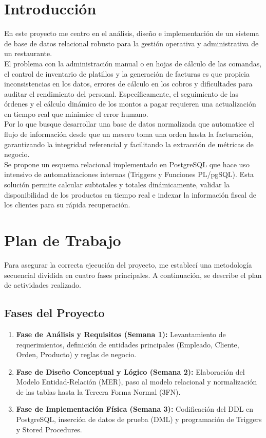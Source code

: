 \documentclass{article}
\begin{document}
\newpage

\section{Introducción}

En este proyecto me centro en el análisis, diseño e implementación de un sistema de base de datos relacional robusto para la gestión operativa y administrativa de un restaurante. \\

El problema con la administración manual o en hojas de cálculo de las comandas, el control de inventario de platillos y la generación de facturas es que propicia inconsistencias en los datos, errores de cálculo en los cobros y dificultades para auditar 
el rendimiento del personal. Específicamente, el seguimiento de las órdenes y el cálculo dinámico de los montos a pagar requieren una actualización en tiempo real que minimice el error humano. \\

Por lo que busque desarrollar una base de datos normalizada que automatice el flujo de información desde que un mesero toma una orden hasta la facturación, garantizando la integridad referencial y facilitando la extracción de métricas de negocio. \\

Se propone un esquema relacional implementado en PostgreSQL que hace uso intensivo de automatizaciones internas (Triggers y Funciones PL/pgSQL). Esta solución permite calcular subtotales y totales dinámicamente, validar la disponibilidad de los productos 
en tiempo real e indexar la información fiscal de los clientes para su rápida recuperación. 

\section{Plan de Trabajo}

Para asegurar la correcta ejecución del proyecto, me establecí una metodología secuencial dividida en cuatro fases principales. A continuación, se describe el plan de actividades realizado.

\subsection{Fases del Proyecto}
\begin{enumerate}
    \item \textbf{Fase de Análisis y Requisitos (Semana 1):} Levantamiento de requerimientos, definición de entidades principales (Empleado, Cliente, Orden, Producto) y reglas de negocio.
    \item \textbf{Fase de Diseño Conceptual y Lógico (Semana 2):} Elaboración del Modelo Entidad-Relación (MER), paso al modelo relacional y normalización de las tablas hasta la Tercera Forma Normal (3FN).
    \item \textbf{Fase de Implementación Física (Semana 3):} Codificación del DDL en PostgreSQL, inserción de datos de prueba (DML) y programación de Triggers y Stored Procedures.
\end{enumerate}
\end{document}
